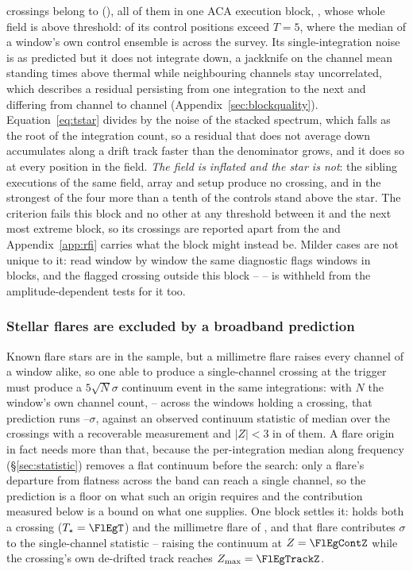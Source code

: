 \BdNCross{} crossings belong to \BdStar{} (\BdAlias), all of them in one ACA
execution block, \texttt{\BdBlock}, whose whole field is above threshold:
\BdNCtrlAbove{} of its \BdNCtrl{} control positions exceed $T=5$, where the
median of a window's own control ensemble is \BdSurvCtrlMed{} across the
survey. Its
single-integration noise is as predicted but it does not integrate down, a
jackknife on the channel mean standing \BdJackRatio{} times above thermal while
neighbouring channels stay uncorrelated, which describes a residual persisting
from one integration to the next and differing from channel to channel
(Appendix~\ref{sec:blockquality}). Equation~\ref{eq:tstar} divides by the noise
of the stacked spectrum, which falls as the root of the integration count, so a
residual that does not average down accumulates along a drift track faster than
the denominator grows, and it does so at every position in the field.
\emph{The field is inflated and the star is not}: the \BdNSibling{} sibling
executions of the same field, array and setup produce no crossing, and in the
strongest of the four more than a tenth of the \BdNCtrl{} controls stand above
the star. The criterion fails this block and no other at any threshold between
it and the next most extreme block, so its \BdNCross{} crossings are reported
apart from the \EvNCrossQp{} and Appendix~\ref{app:rfi} carries what the block
might instead be. Milder cases are not unique to it: read window by window the
same diagnostic flags \DqNWin{} windows in \BkFlagNBlock{} blocks, and the
\BkFlagNCrossOther{} flagged crossing outside this block -- \BkFlagOtherStar{}
-- is withheld from the amplitude-dependent tests for it too.

\subsubsection{Stellar flares are excluded by a broadband prediction}

Known flare stars are in the sample, but a millimetre flare raises every
channel of a window alike, so one able to produce a single-channel crossing at
the trigger must produce a $5\sqrt{N}\sigma$ continuum event in the same
integrations: with $N$ the window's own channel count,
\FlNChanLo--\FlNChanHi{} across the windows holding a crossing, that prediction
runs \FlPredLo--\FlPredHi$\sigma$, against an observed continuum statistic of
median \FlObsMed{} over the \FlNCont{} crossings with a recoverable measurement
and $|Z|<3$ in \FlNQuiet{} of them. A flare origin in fact needs more than
that, because the per-integration median along frequency
(\S\ref{sec:statistic}) removes a flat continuum before the search: only a
flare's departure from flatness across the band can reach a single channel, so
the prediction is a floor on what such an origin requires and the contribution
measured below is a bound on what one supplies. One block settles it:
\FlEgStar{} \texttt{\FlEgEb} holds both a crossing ($T_\star=\FlEgT$) and the
millimetre flare of \citet{MacGregor2020}, and that flare contributes
\FlEgContrib$\sigma$ to the single-channel statistic -- raising the continuum
at $Z=\FlEgContZ$ while the crossing's own de-drifted track reaches
$Z_{\max}=\FlEgTrackZ$.

